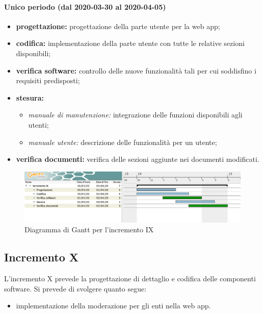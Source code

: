 				\paragraph{Unico periodo (dal 2020-03-30 al 2020-04-05)}
				
					\begin{itemize}
						\item \textbf{progettazione:} progettazione della parte utente per la web app;
						\item \textbf{codifica:} implementazione della parte utente con tutte le relative sezioni disponibili;
						\item \textbf{verifica software:} controllo delle nuove funzionalità tali per cui soddisfino i requisiti predisposti;
						\item \textbf{stesura:} 
							\begin{itemize}
								\item \textit{manuale di manutenzione:} integrazione delle funzioni disponibili agli utenti;
								\item \textit{manuale utente:} descrizione delle funzionalità per un utente;
							\end{itemize}
						\item \textbf{verifica documenti:} verifica delle sezioni aggiunte nei documenti modificati.
					\end{itemize} 			

		\begin{landscape}
          \begin{figure}[H]
            \centering
            \includegraphics[width=\linewidth]{images/gantt/incrementoIX} %
            \caption{Diagramma di Gantt per l'incremento IX}
          \end{figure}		
		\end{landscape}


		\subsection{Incremento X}
			
			L'incremento X prevede la progettazione di dettaglio e codifica delle componenti software. Si prevede di svolgere quanto segue:
			\begin{itemize}
				\item implementazione della moderazione per gli enti nella web app.
			\end{itemize}
			
